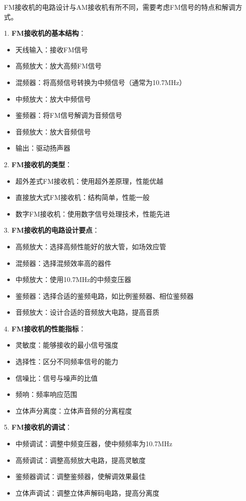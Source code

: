 \documentclass[12pt,UTF8]{ctexbook}
\begin{document}
FM接收机的电路设计与AM接收机有所不同，需要考虑FM信号的特点和解调方式。

1. \textbf{FM接收机的基本结构}：
   \begin{itemize}[leftmargin=3.5em]
   \item 天线输入：接收FM信号
   \item 高频放大：放大高频FM信号
   \item 混频器：将高频信号转换为中频信号（通常为10.7MHz）
   \item 中频放大：放大中频信号
   \item 鉴频器：将FM信号解调为音频信号
   \item 音频放大：放大音频信号
   \item 输出：驱动扬声器
   \end{itemize}

2. \textbf{FM接收机的类型}：
   \begin{itemize}[leftmargin=3.5em]
   \item 超外差式FM接收机：使用超外差原理，性能优越
   \item 直接放大式FM接收机：结构简单，性能一般
   \item 数字FM接收机：使用数字信号处理技术，性能先进
   \end{itemize}

3. \textbf{FM接收机的电路设计要点}：
   \begin{itemize}[leftmargin=3.5em]
   \item 高频放大：选择高频性能好的放大管，如场效应管
   \item 混频器：选择混频效率高的器件
   \item 中频放大：使用10.7MHz的中频变压器
   \item 鉴频器：选择合适的鉴频电路，如比例鉴频器、相位鉴频器
   \item 音频放大：设计合适的音频放大电路，提高音质
   \end{itemize}

4. \textbf{FM接收机的性能指标}：
   \begin{itemize}[leftmargin=3.5em]
   \item 灵敏度：能够接收的最小信号强度
   \item 选择性：区分不同频率信号的能力
   \item 信噪比：信号与噪声的比值
   \item 频响：频率响应范围
   \item 立体声分离度：立体声音频的分离程度
   \end{itemize}

5. \textbf{FM接收机的调试}：
   \begin{itemize}[leftmargin=3.5em]
   \item 中频调试：调整中频变压器，使中频频率为10.7MHz
   \item 高频调试：调整高频放大电路，提高灵敏度
   \item 鉴频器调试：调整鉴频器，使解调效果最佳
   \item 立体声调试：调整立体声解码电路，提高分离度
   \end{itemize}
\end{document}
